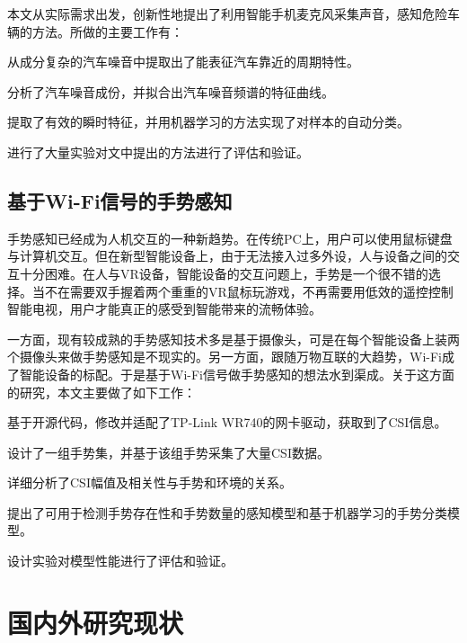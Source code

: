 本文从实际需求出发，创新性地提出了利用智能手机麦克风采集声音，感知危险车辆的方法。所做的主要工作有：
\begin{compactenum}
\item 从成分复杂的汽车噪音中提取出了能表征汽车靠近的周期特性。
\item 分析了汽车噪音成份，并拟合出汽车噪音频谱的特征曲线。
\item 提取了有效的瞬时特征，并用机器学习的方法实现了对样本的自动分类。
\item 进行了大量实验对文中提出的方法进行了评估和验证。
\end{compactenum}

\subsection{基于Wi-Fi信号的手势感知}
手势感知已经成为人机交互的一种新趋势。在传统PC上，用户可以使用鼠标键盘与计算机交互。但在新型智能设备上，由于无法接入过多外设，人与设备之间的交互十分困难。在人与VR设备，智能设备的交互问题上，手势是一个很不错的选择。当不在需要双手握着两个重重的VR鼠标玩游戏，不再需要用低效的遥控控制智能电视，用户才能真正的感受到智能带来的流畅体验。

一方面，现有较成熟的手势感知技术多是基于摄像头，可是在每个智能设备上装两个摄像头来做手势感知是不现实的。另一方面，跟随万物互联的大趋势，Wi-Fi成了智能设备的标配。于是基于Wi-Fi信号做手势感知的想法水到渠成。关于这方面的研究，本文主要做了如下工作：
\begin{compactenum}
\item 基于开源代码，修改并适配了TP-Link WR740的网卡驱动，获取到了CSI信息。
\item 设计了一组手势集，并基于该组手势采集了大量CSI数据。
\item 详细分析了CSI幅值及相关性与手势和环境的关系。
\item 提出了可用于检测手势存在性和手势数量的感知模型和基于机器学习的手势分类模型。
\item 设计实验对模型性能进行了评估和验证。
\end{compactenum}


\section{国内外研究现状}


